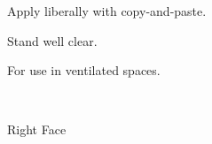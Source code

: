 \documentclass{article}
\begin{document}
\begin{ProductBox}
\begin{LeftFace}[left color=green!20,right color=yellow!80]
\flushleft\small
Apply liberally with copy-and-paste.

Stand well clear.

For use in ventilated spaces.

\vspace{2em}
 \hfil {}\hss

\medskip
\noindent\hfil\ \hfill\ 

\end{LeftFace}
\begin{RightFace}[left color=white,right color=black]
\large Right Face
\end{RightFace}
\end{ProductBox}
\end{document}

